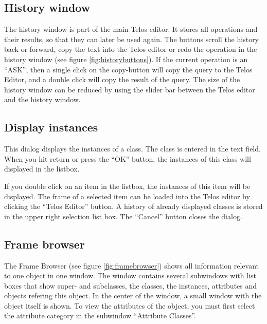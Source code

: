 \subsection{History window}
\label{sec:history_window}

The history window is part of the main Telos editor. It stores all operations and their
results, so that they can later be used again. The buttons scroll the history back or forward,
copy the text into the Telos editor or redo the operation in the history window (see figure \ref{fig:historybuttons}).
If the current operation is an ``ASK'', then a single click on the copy-button will copy the
query to the Telos Editor, and a double click will copy the result of the query.
The size of the history window can be reduced by using the slider bar between the
Telos editor and the history window.


\subsection{Display instances}
\label{sec:display_instances}

This dialog displays the instances of a class. The class is entered in the
text field. When you hit return or press the ``OK'' button, the instances of this
class will displayed in the listbox.

If you double click on an item in the listbox, the instances of this item
will be displayed. The frame of a selected item can be loaded into the Telos
editor by clicking the ``Telos Editor'' button.
A history of already displayed classes is stored in the upper right
selection list box. The ``Cancel'' button closes the dialog.

\subsection{Frame browser}
\label{sec:frame_browser}

The Frame Browser (see figure \ref{fig:framebrowser}) shows all information relevant to one object in one
window. The window contains several subwindows with list boxes that show
super- and subclasses, the classes, the instances, attributes and
objects refering this object. In the center of the window, a small
window with the object itself is shown.
To view the attributes of the object, you must first select the
attribute category in the subwindow ``Attribute Classes''.

